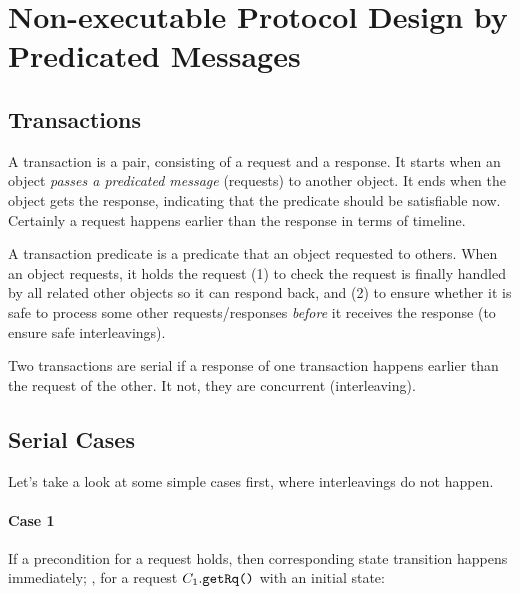 \documentclass[format=manuscript]{acmart}
\begin{document}
\section{Non-executable Protocol Design by Predicated Messages}

\subsection{Transactions}

\begin{definition}[Transaction]
  A transaction is a pair, consisting of a request and a response. It starts
  when an object \emph{passes a predicated message} (requests) to another
  object. It ends when the object gets the response, indicating that the
  predicate should be satisfiable now. Certainly a request happens earlier than
  the response in terms of timeline.
\end{definition}

\begin{definition}
  A transaction predicate is a predicate that an object requested to
  others. When an object requests, it holds the request (1) to check the request
  is finally handled by all related other objects so it can respond back, and
  (2) to ensure whether it is safe to process some other requests/responses
  \emph{before} it receives the response (to ensure safe interleavings).
\end{definition}

\begin{definition}
  Two transactions are serial if a response of one transaction happens earlier
  than the request of the other. It not, they are concurrent (interleaving).
\end{definition}

\subsection{Serial Cases}\label{serial-cases}

Let's take a look at some simple cases first, where interleavings do not happen.

\paragraph{Case 1}
If a precondition for a request holds, then corresponding state transition
happens immediately; \eg{}, for a request $C_1.\texttt{getRq()}$ with an initial
state:
\end{document}
